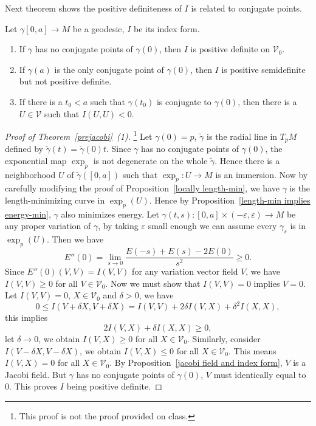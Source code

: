 Next theorem shows the positive definiteness of $I$ is related to conjugate points.
\begin{thm}\label{prejacobi}
    Let $\gamma[0,a]\to M$ be a geodesic, $I$ be its index form.
    \begin{enumerate}[(1)]
        \item If $\gamma$ has no conjugate points of $\gamma(0)$, then $I$ is positive definite on $\mathscr{V}_0$.
        \item If $\gamma(a)$ is the only conjugate point of $\gamma(0)$, then $I$ is positive semidefinite but not positive definite.
        \item If there is a $t_0<a$ such that $\gamma(t_0)$ is conjugate to $\gamma(0)$, then there is a $U\in\mathscr{V}$ such that $I(U,U)<0$.
    \end{enumerate}
\end{thm}
\begin{proof}[Proof of Theorem~\ref{prejacobi}~(1)]\footnote{This proof is not the proof provided on class.}
    Let $\gamma(0)=p$, $\tilde{\gamma}$ is the radial line in $T_pM$ defined by $\tilde{\gamma}(t)=\dot{\gamma}(0)t$.
    Since $\gamma$ has no conjugate points of $\gamma(0)$, the exponential map $\exp_p$ is not degenerate on the whole $\tilde\gamma$.
    Hence there is a neighborhood $U$ of $\tilde{\gamma}([0,a])$ such that $\exp_p:U\to M$ is an immersion.
    Now by carefully modifying the proof of Proposition~\ref{locally length-min}, we have $\gamma$ is the length-minimizing curve in $\exp_p(U)$.
    Hence by Proposition~\ref{length-min implies energy-min}, $\gamma$ also minimizes energy.
    Let $\gamma(t,s):[0,a]\times(-\varepsilon,\varepsilon)\to M$ be any proper variation of $\gamma$, by taking $\varepsilon$ small enough we can assume every $\gamma_s$ is in $\exp_p(U)$.
    Then we have
    \[E''(0)=\lim_{s\to 0}\frac{E(-s)+E(s)-2E(0)}{s^2}\geq 0.\]
    Since $E''(0)(V,V)=I(V,V)$ for any variation vector field $V$, we have $I(V,V)\geq 0$ for all $V\in\mathscr{V}_0$.
    Now we must show that $I(V,V)=0$ implies $V=0$.
    Let $I(V,V)=0$, $X\in\mathscr{V}_0$ and $\delta>0$, we have
    \[0\leq I(V+\delta X,V+\delta X)=I(V,V)+2\delta I(V,X)+\delta^2 I(X,X),\]
    this implies
    \[2I(V,X)+\delta I(X,X)\geq 0,\]
    let $\delta\to 0$, we obtain $I(V,X)\geq 0$ for all $X\in\mathscr{V}_0$.
    Similarly, consider $I(V-\delta X,V-\delta X)$, we obtain $I(V,X)\leq 0$ for all $X\in\mathscr{V}_0$.
    This means $I(V,X)=0$ for all $X\in\mathscr{V}_0$.
    By Proposition~\ref{jacobi field and index form}, $V$ is a Jacobi field.
    But $\gamma$ has no conjugate points of $\gamma(0)$, $V$ must identically equal to $0$.
    This proves $I$ being positive definite.
\end{proof}

